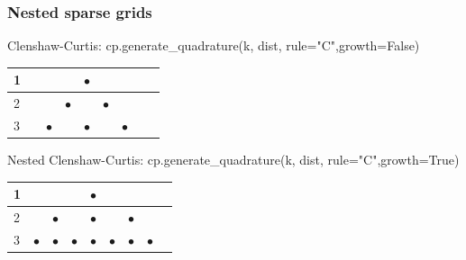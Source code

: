 \documentclass{beamer}
\begin{document}
 
 \begin{frame}
  \frametitle{Nested sparse grids}
 Clenshaw-Curtis: cp.generate\_quadrature(k, dist, rule="C",growth=False)
  \begin{table}
  \begin{tabular}{lcccccccc}
    1& &&& $\bullet$& &&&  \\\hline
   2 &&&$\bullet$& &$\bullet$&&& \\\hline
   3 &&$\bullet$&&$\bullet$ &&$\bullet$&& \\
   \end{tabular}
  \end{table}
  
  
  Nested Clenshaw-Curtis: cp.generate\_quadrature(k, dist, rule="C",growth=True)
  \begin{table}
  \begin{tabular}{lcccccccc}
    1& &&& $\bullet$& &&&  \\\hline
   2 &&$\bullet$&& $\bullet$&&$\bullet$ && \\\hline
   3 &$\bullet$&$\bullet$&$\bullet$& $\bullet$&$\bullet$&$\bullet$ &$\bullet$& \\
   \end{tabular}
  \end{table}
 
  \end{frame}
\end{document}
